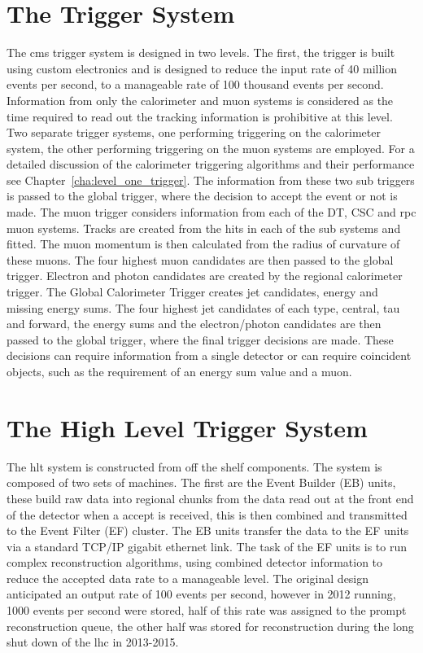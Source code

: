 \section{The \Lone Trigger System} %
\label{sec:the_level_one_trigger_system}
The \ac{cms} trigger system is designed in two levels. The first, the \Lone
trigger is built using custom electronics and is designed to reduce the input
rate of 40 million events per second, to a manageable rate of 100 thousand
events per second. Information from only the calorimeter and muon systems is
considered as the time required to read out the tracking information is
prohibitive at this level. Two separate trigger systems, one performing
triggering on the calorimeter system, the other performing triggering on the
muon systems are employed. For a detailed discussion of the calorimeter
triggering algorithms and their performance see
Chapter~\ref{cha:level_one_trigger}. The information from these two sub
triggers is passed to the global trigger, where the decision to accept the
event or not is made.
The muon trigger considers information from each of the DT, CSC and \ac{rpc}
muon systems. Tracks are created from the hits in each of the sub systems and
fitted. The muon momentum is then calculated from the radius of curvature of
these muons. The four highest \PT muon candidates are then passed to the global
trigger.
Electron and photon candidates are created by the regional calorimeter trigger.
The Global Calorimeter Trigger creates jet candidates, energy and missing energy sums. The four highest \ET jet candidates of each type, central, tau and forward, the energy sums and the electron/photon candidates are then passed to the global trigger, where the final trigger decisions are made. These decisions can require information from a single detector or can require coincident objects, such as the requirement of an energy sum value and a muon.

\section{The High Level Trigger System} %
\label{sec:the_high_level_trigger_system}
The \ac{hlt} system is constructed from off the shelf components.
The system is composed of two sets of machines. The first are the Event Builder
(EB) units, these build raw data into regional chunks from the data read out
at the front end of the detector when a \Lone accept is received, this is then 
combined and transmitted to the Event Filter (EF) cluster. The EB units 
transfer the data to the EF units via a standard TCP/IP gigabit ethernet link.
The task of the EF units is to run complex reconstruction algorithms, using
combined detector information to reduce the accepted data rate to a manageable 
level. The original design anticipated an output rate of 100 events per second, 
however in 2012 running, 1000 events per second were stored, half of this rate 
was assigned to the prompt reconstruction queue, the other half was stored for 
reconstruction during the long shut down of the \ac{lhc} in 2013-2015.


